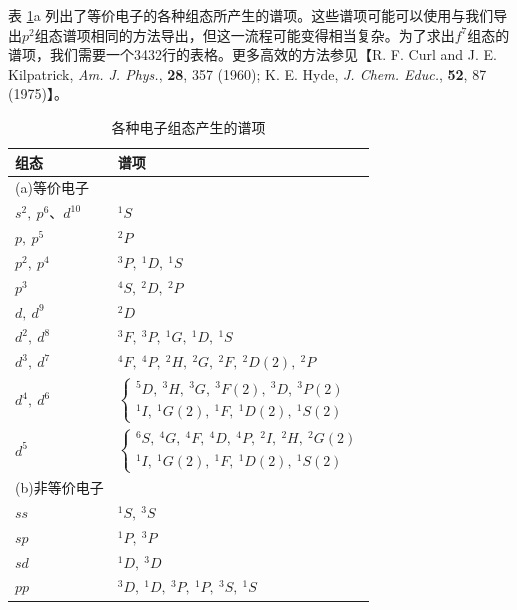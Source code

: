     表 \ref{tab:11.2}a 列出了等价电子的各种组态所产生的谱项。这些谱项可能可以使用与我们导出$p^2$组态谱项相同的方法导出，但这一流程可能变得相当复杂。为了求出$f^7$组态的谱项，我们需要一个3432行的表格。更多高效的方法参见【R. F. Curl and J. E. Kilpatrick, \textit{Am. J. Phys.}, \textbf{28}, 357 (1960); K. E. Hyde, \textit{J. Chem. Educ.}, \textbf{52}, 87 (1975)】。
    \begin{table}[htbp]
        \centering
        \begin{tabular}{|l|l|}
            \hline
            组态 & 谱项 \\
            \hline
            (a)等价电子 & \\
            \hline
            $s^2,\:p^6$、$d^{10}$ & $^1S$ \\
            \hline
            $p,\:p^5$ & $^2P$ \\
            \hline
            $p^2,\:p^4$ & $^3P,\: ^1D,\: ^1S$ \\
            \hline
            $p^3$ & $^4S,\: ^2D,\: ^2P$ \\
            \hline
            $d,\:d^9$ & $^2D$ \\
            \hline
            $d^2,\:d^8$ & $^3F,\: ^3P,\: ^1G,\: ^1D,\: ^1S$ \\
            \hline
            $d^3,\:d^7$ & $^4F,\: ^4P,\: ^2H,\: ^2G,\: ^2F,\: ^2D\left(2\right),\: ^2P$ \\
            \hline
            $d^4,\:d^6$ & $\begin{cases}
                ^5D,\: ^3H,\: ^3G,\: ^3F\left(2\right),\: ^3D,\: ^3P\left(2\right) \\
                ^1I,\: ^1G\left(2\right),\: ^1F,\: ^1D\left(2\right),\: ^1S\left(2\right)
                \end{cases}$ \\
            \hline
            $d^5$ & $\begin{cases}
                ^6S,\: ^4G,\: ^4F,\: ^4D,\: ^4P,\: ^2I,\: ^2H,\: ^2G\left(2\right) \\
                ^1I,\: ^1G\left(2\right),\: ^1F,\: ^1D\left(2\right),\: ^1S\left(2\right)
            \end{cases}$ \\
            \hline
            (b)非等价电子 & \\
            \hline
            $ss$ & $^1S,\: ^3S$ \\
            \hline
            $sp$ & $^1P,\: ^3P$ \\
            \hline
            $sd$ & $^1D,\: ^3D$ \\
            \hline
            $pp$ & $^3D,\: ^1D,\: ^3P,\: ^1P,\: ^3S,\: ^1S$ \\
            \hline
        \end{tabular}
        \caption{各种电子组态产生的谱项}
        \label{tab:11.2}
    \end{table}

